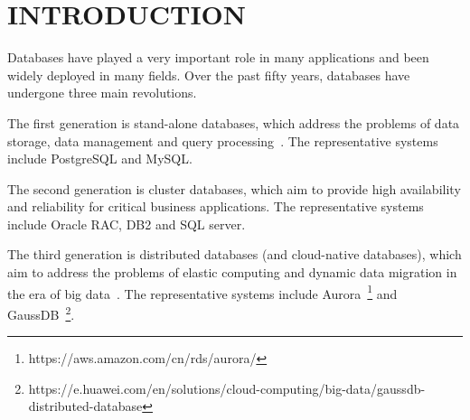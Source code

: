 
\section{INTRODUCTION}
\label{sec: introduction}


Databases have played a very important role in many applications and been widely deployed in many fields. Over the past fifty years, databases have undergone three main revolutions. 

The first generation is stand-alone databases, which address the problems of data storage, data management and query processing~\cite{DBLP:books/daglib/0006734}. The representative systems include PostgreSQL and MySQL. 
	

The second generation is cluster databases, which aim to provide high availability and reliability for critical business applications. The representative systems include Oracle RAC, DB2 and SQL server. 
 

The third generation is distributed databases (and cloud-native databases), which aim to address the problems of elastic computing and dynamic data migration in the era of big data~\cite{DBLP:journals/jidm/FigueiredoBM10}. The representative systems include Aurora~\footnote{https://aws.amazon.com/cn/rds/aurora/} and GaussDB~\footnote{https://e.huawei.com/en/solutions/cloud-computing/big-data/gaussdb-distributed-database}. 
	

